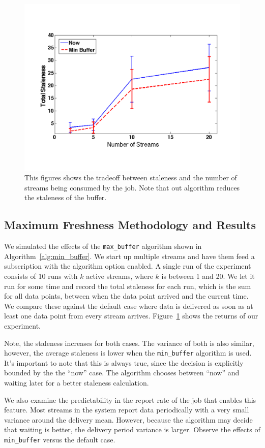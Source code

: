 \begin{figure}[h!] %
\centering
\includegraphics[width=0.75\columnwidth]{figs/staleness_vs_numstreams}
\caption{This figures shows the tradeoff between staleness and the number of streams being consumed by the job.  Note 
that out algorithm reduces the staleness of the buffer.}
\label{fig:stalevsstreams}
\end{figure}

\subsection{Maximum Freshness Methodology and Results}

We simulated the effects of the \texttt{max\_buffer} algorithm shown in Algorithm~\ref{alg:min_buffer}.  We start up multiple streams and
have them feed a subscription with the algorithm option enabled.  A single run of the experiment consists of 10 runs with $k$ active streams,
where $k$ is between 1 and 20.  We let it run for some time and record the total staleness for each run, which is the sum for all data points, between
when the data point arrived and the current time.  We compare these against the default case where data is delivered as soon as at least one data point from every stream arrives.  Figure~\ref{fig:stalevsstreams} shows the returns of our experiment.

Note, the staleness increases for both cases.  The variance of both is also similar, however, the average staleness is lower 
when the \texttt{min\_buffer} algorithm is used.  It's important to note that this is always true, since the decision is explicitly
bounded by the the ``now'' case.  The algorithm chooses between ``now'' and waiting later for a better staleness calculation.

We also examine the predictability in the report rate of the job that enables this feature.  Most streams in the system report data periodically
with a very small variance around the delivery mean.  However, because the algorithm may decide that waiting is better, the delivery
period variance is larger.  Observe the effects of \texttt{min\_buffer} versus the default case.

